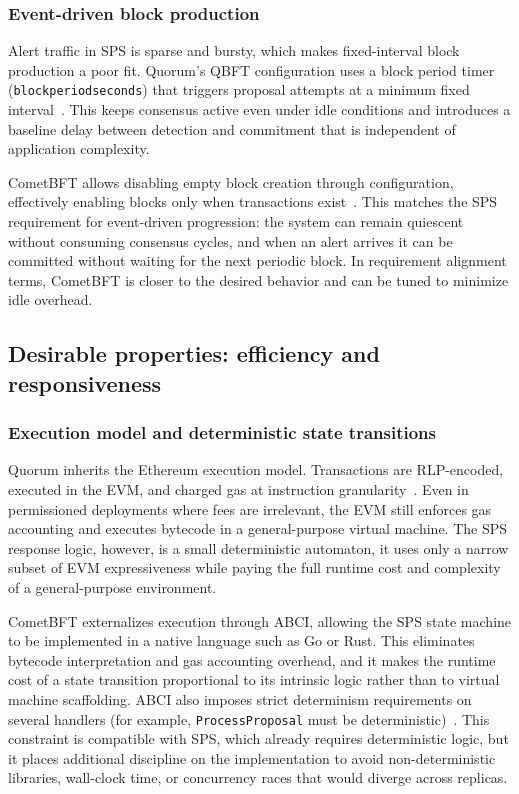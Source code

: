 \subsubsection{Event-driven block production}
Alert traffic in SPS is sparse and bursty, which makes fixed-interval block production a poor fit. Quorum's QBFT configuration uses a block period timer (\texttt{blockperiodseconds}) that triggers proposal attempts at a minimum fixed interval~\cite{QBFTCons90:online}. This keeps consensus active even under idle conditions and introduces a baseline delay between detection and commitment that is independent of application complexity.

CometBFT allows disabling empty block creation through configuration, effectively enabling blocks only when transactions exist~\cite{cometbftConfig}. This matches the SPS requirement for event-driven progression: the system can remain quiescent without consuming consensus cycles, and when an alert arrives it can be committed without waiting for the next periodic block. In requirement alignment terms, CometBFT is closer to the desired behavior and can be tuned to minimize idle overhead.

\subsection{Desirable properties: efficiency and responsiveness}

\subsubsection{Execution model and deterministic state transitions}
Quorum inherits the Ethereum execution model. Transactions are RLP-encoded, executed in the EVM, and charged gas at instruction granularity~\cite{buterin2013ethereum}. Even in permissioned deployments where fees are irrelevant, the EVM still enforces gas accounting and executes bytecode in a general-purpose virtual machine. The SPS response logic, however, is a small deterministic automaton, it uses only a narrow subset of EVM expressiveness while paying the full runtime cost and complexity of a general-purpose environment.

CometBFT externalizes execution through ABCI, allowing the SPS state machine to be implemented in a native language such as Go or Rust. This eliminates bytecode interpretation and gas accounting overhead, and it makes the runtime cost of a state transition proportional to its intrinsic logic rather than to virtual machine scaffolding. ABCI also imposes strict determinism requirements on several handlers (for example, \texttt{ProcessProposal} must be deterministic)~\cite{abciOverview}. This constraint is compatible with SPS, which already requires deterministic logic, but it places additional discipline on the implementation to avoid non-deterministic libraries, wall-clock time, or concurrency races that would diverge across replicas.

